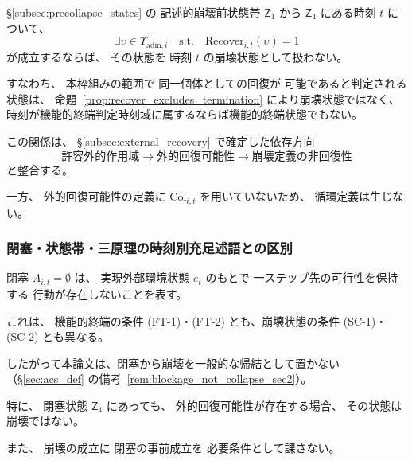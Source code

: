\begin{remark}[回復可能な状態は崩壊として扱わない]
\label{rem:C2_and_recoverability}
\S\ref{subsec:precollapse_states} の
記述的崩壊前状態帯
$\mathsf{Z}_1$ から
$\mathsf{Z}_4$
にある時刻 $t$ について、
\[
  \exists\upsilon\in\Upsilon_{\mathrm{adm},i}
  \quad\text{s.t.}\quad
  \mathrm{Recover}_{i,t}(\upsilon)=1
\]
が成立するならば、
その状態を
時刻 $t$ の崩壊状態として扱わない。

すなわち、
本枠組みの範囲で
同一個体としての回復が
可能であると判定される状態は、
命題~\ref{prop:recover_excludes_termination} により崩壊状態ではなく、
時刻が機能的終端判定時刻域に属するならば機能的終端状態でもない。

この関係は、
\S\ref{subsec:external_recovery}
で確定した依存方向
\[
  \text{許容外的作用域}
  \longrightarrow
  \text{外的回復可能性}
  \longrightarrow
  \text{崩壊定義の非回復性}
\]
と整合する。

一方、
外的回復可能性の定義に
$\mathrm{Col}_{i,t}$
を用いていないため、
循環定義は生じない。
\end{remark}

\subsubsection{閉塞・状態帯・三原理の時刻別充足述語との区別}

\begin{remark}[閉塞と崩壊の帰結関係の限定]
\label{rem:collapse_non_implication}
閉塞
$A_{i,t}=\emptyset$
は、
実現外部環境状態 $e_t$ のもとで
一ステップ先の可行性を保持する
行動が存在しないことを表す。

これは、
機能的終端の条件
(FT-1)・(FT-2)
とも、崩壊状態の条件
(SC-1)・(SC-2)
とも異なる。

したがって本論文は、閉塞から崩壊を一般的な帰結として置かない
（\S\ref{sec:acs_def} の備考~\ref{rem:blockage_not_collapse_sec2}）。

特に、
閉塞状態
$\mathsf{Z}_4$
にあっても、
外的回復可能性が存在する場合、
その状態は崩壊ではない。

また、
崩壊の成立に
閉塞の事前成立を
必要条件として課さない。
\end{remark}

